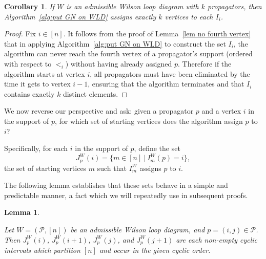 \documentclass[11pt]{article}
\newcommand{\cP}{\mathcal{P}}
\newtheorem{lem}[thm]{Lemma}
\newtheorem{cor}[thm]{Corollary}
\theoremstyle{remark}
\theoremstyle{definition}
\begin{document}
\begin{cor}\label{GN alg well defined}
If $W$ is an admissible Wilson loop diagram with $k$ propagators, then Algorithm~\ref{alg:put GN on WLD} assigns exactly $k$ vertices to each $I_i$.
\end{cor}
\begin{proof}
Fix $i \in [n]$. It follows from the proof of Lemma~\ref{lem no fourth vertex} that in applying Algorithm~\ref{alg:put GN on WLD} to construct the set $I_i$, the algorithm can never reach the fourth vertex of a propagator's support (ordered with respect to $<_i$) without having already assigned $p$. Therefore if the algorithm starts at vertex $i$, all propagators must have been eliminated by the time it gets to vertex $i-1$, ensuring that the algorithm terminates and that $I_i$ contains exactly $k$ distinct elements.
\end{proof}

We now reverse our perspective and ask: given a propagator $p$ and a vertex $i$ in the support of $p$, for which set of starting vertices does the algorithm assign $p$ to $i$? 






Specifically, for each $i$ in the support of $p$, define the set
\[J_p^{W}(i) = \{m \in [n] \ | \ I^{W}_m(p) = i \},\]
the set of starting vertices $m$ such that $I_m^{W}$ assigns $p$ to $i$. 

The following lemma establishes that these sets behave in a simple and predictable manner, a fact which we will repeatedly use in subsequent proofs.




\begin{lem} \label{vertex cyclic int lem}
  
Let $W = (\cP,[n])$ be an admissible Wilson loop diagram, and $p = (i,j) \in \cP$.  Then $J_p^{W}(i)$, $J_p^{W}(i+1)$, $J_p^{W}(j)$, and $J_p^{W}(j+1)$ are each non-empty cyclic intervals which partition $[n]$ and occur in the given cyclic order.
\end{lem}
\end{document}
